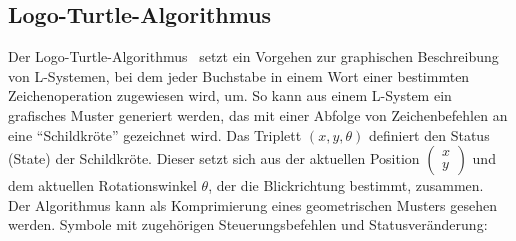 \subsection*{Logo-Turtle-Algorithmus}
Der Logo-Turtle-Algorithmus~\cite{prusinkiewicz_1986} setzt ein Vorgehen zur graphischen Beschreibung von L-Systemen, bei dem
jeder Buchstabe in einem Wort einer bestimmten Zeichenoperation zugewiesen wird, um.
So kann aus einem L-System ein grafisches Muster generiert werden, das mit einer Abfolge von Zeichenbefehlen an
eine "`Schildkröte"' gezeichnet wird.
Das Triplett $(x,y,\theta)$ definiert den Status (State) der Schildkröte.
Dieser setzt sich aus der aktuellen Position $\left(\begin{smallmatrix} x \\ y \end{smallmatrix}\right)$ und dem
aktuellen Rotationswinkel $\theta$, der die Blickrichtung bestimmt, zusammen.\\
Der Algorithmus kann als Komprimierung eines geometrischen Musters gesehen werden.
Symbole mit zugehörigen Steuerungsbefehlen und Statusveränderung:
